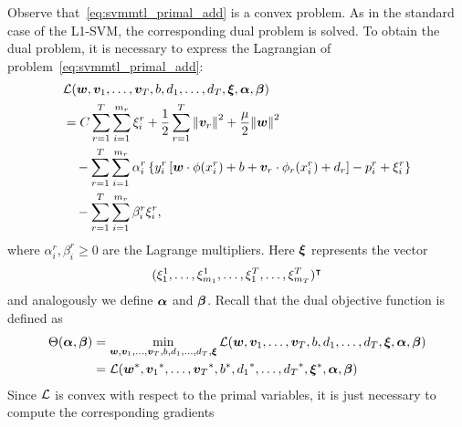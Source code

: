 Observe that~\eqref{eq:svmmtl_primal_add} is a convex problem. As in the standard case of the L1-SVM, the corresponding dual problem is solved. To obtain the dual problem, it is necessary to express the Lagrangian of problem~\eqref{eq:svmmtl_primal_add}:
\begin{equation}\label{eq:svmmtl_lagrangian_add}
    \begin{aligned}
        & \lagr(\fv{w}, \fv{v}_1, \ldots, \fv{v}_\ntasks, b, d_1, \ldots, d_\ntasks, \fv{\xi}, \fv{\alpha}, \fv{\beta}) \\
        &=  C \sum_{r= 1}^T \sum_{i=1}^{m_r} {\xi_{i}^r} + \frac{1}{2} \sum_{r= 1}^T{\norm{\fv{v}_r}^2} + \frac{\mu}{2} {\norm{\fv{w}}}^2 \\
        &\quad -  \sum_{r= 1}^T \sum_{i=1}^{m_r} \alpha_i^r \left\lbrace y_{i}^r \left[ \fv{w} \cdot \phi(x_{i}^r) + b + \fv{v}_r \cdot \phi_r(x_{i}^r) + d_r \right] - p_{i}^r + \xi_{i}^r  \right\rbrace \\
        &\quad -  \sum_{r= 1}^T \sum_{i=1}^{m_r} \beta_i^r \xi_i^r ,
    \end{aligned}
\end{equation}
where $\alpha_i^r, \beta_i^r \geq 0$ are the Lagrange multipliers. Here $\bm{\xi}$ represents the vector $$(\xi_1^1, \ldots, \xi_{m_1}^1, \ldots, \xi_1^T, \ldots, \xi_{m_T}^T)^\intercal$$ and analogously we define $\bm{\alpha}$ and $\bm{\beta}$.
Recall that the dual objective function is defined as 
\begin{equation}\nonumber
    \begin{aligned}
         \Theta(\bm{\alpha}, \bm{\beta}) &=  \min_{\bm{w}, \bm{v}_1, \ldots, \bm{v}_T, b, d_1, \ldots, d_T, \bm{\xi}} \mathcal{L}(\bm{w}, \bm{v}_1, \ldots, \bm{v}_T, b, d_1, \ldots, d_T, \bm{\xi}, \bm{\alpha}, \bm{\beta}) \\
         &= \mathcal{L}({\bm{w}}^*, {\bm{v}_1}^*, \ldots, {\bm{v}_T}^*, {b}^*, {d_1}^*, \ldots, {d_T}^*, {\bm{\xi}}^*, \bm{\alpha}, \bm{\beta})
    \end{aligned}    
\end{equation}
Since $\mathcal{L}$ is convex with respect to the primal variables, it is just necessary to compute the corresponding gradients
